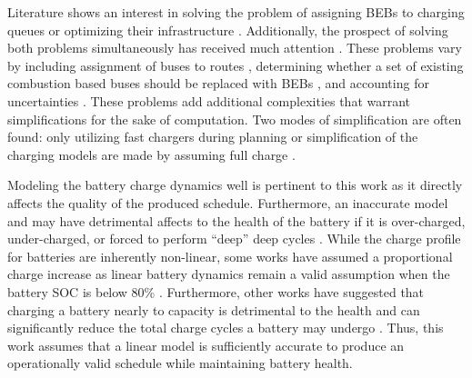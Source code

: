\documentclass[ee,thesis]{usuthesis}
\begin{document}
Literature shows an interest in solving the problem of assigning BEBs to charging queues or optimizing their
infrastructure \cite{wei-2018-optim-spatio,sebastiani-2016-evaluat-elect,hoke-2014-accoun-lithium,wang-2017-elect-vehic}. Additionally, the prospect of solving both problems simultaneously
has received much attention \cite{wei-2018-optim-spatio,sebastiani-2016-evaluat-elect,hoke-2014-accoun-lithium,wang-2017-elect-vehic}. These problems vary by including assignment of buses to routes
\cite{rinaldi-2020-mixed-fleet,zhou-2020-collab-optim,tang-2019-robus-sched,li-2014-trans-bus}, determining
whether a set of existing combustion based buses should be replaced with BEBs \cite{zhou-2020-bi-objec,duan-2021-refor-mixed,rinaldi-2020-mixed-fleet,zhou-2020-collab-optim}, and accounting for uncertainties
\cite{bie-2021-optim-elect,duan-2021-refor-mixed,tang-2019-robus-sched,ursavas-2016-optim-polic}. These problems
add additional complexities that warrant simplifications for the sake of computation. Two modes of simplification are
often found: only utilizing fast chargers during planning \cite{li-2014-trans-bus,li-2014-trans-bus,wang-2017-optim-rechar} or simplification of the charging models are made by assuming full charge
\cite{zhou-2020-bi-objec,qarebagh-2019-optim-sched,wei-2018-optim-spatio}.

Modeling the battery charge dynamics well is pertinent to this work as it directly affects the quality of the produced
schedule. Furthermore, an inaccurate model and may have detrimental affects to the health of the battery if it is
over-charged, under-charged, or forced to perform ``deep'' deep cycles \cite{zhou-2020-bi-objec,millner-2010-model-lithium,edge-2021-lithium}. While the charge profile for batteries are inherently non-linear, some
works have assumed a proportional charge increase as linear battery dynamics remain a valid assumption when the battery
SOC is below 80\% \cite{liu-2020-batter-elect}. Furthermore, other works have suggested that charging a battery nearly
to capacity is detrimental to the health and can significantly reduce the total charge cycles a battery may undergo
\cite{edge-2021-lithium,millner-2010-model-lithium}. Thus, this work assumes that a linear model is sufficiently
accurate to produce an operationally valid schedule while maintaining battery health.
\end{document}
